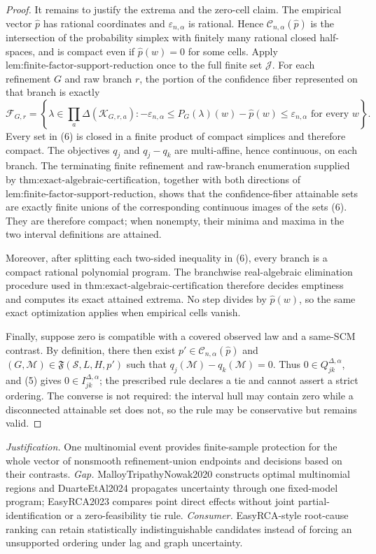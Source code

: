 \documentclass{article}
\begin{document}
\begin{proof}
It remains to justify the extrema and the zero-cell claim.  The empirical vector \(\widehat p\) has rational coordinates and \(\varepsilon_{n,\alpha}\) is rational.  Hence \(\mathcal C_{n,\alpha}(\widehat p)\) is the intersection of the probability simplex with finitely many rational closed half-spaces, and is compact even if \(\widehat p(w)=0\) for some cells.  Apply \(\text{lem:finite-factor-support-reduction}\) once to the full finite set \(\mathcal J\).  For each refinement \(G\) and raw branch \(r\), the portion of the confidence fiber represented on that branch is exactly
\[
\mathcal F_{G,r}
=\left\{\lambda\in\prod_a\Delta(\mathcal K_{G,r,a}):
-\varepsilon_{n,\alpha}
\le P_G(\lambda)(w)-\widehat p(w)
\le\varepsilon_{n,\alpha}
\text{ for every }w\right\}.
\tag{6}
\]
Every set in (6) is closed in a finite product of compact simplices and therefore compact.  The objectives \(q_j\) and \(q_j-q_k\) are multi-affine, hence continuous, on each branch.  The terminating finite refinement and raw-branch enumeration supplied by \(\text{thm:exact-algebraic-certification}\), together with both directions of \(\text{lem:finite-factor-support-reduction}\), shows that the confidence-fiber attainable sets are exactly finite unions of the corresponding continuous images of the sets (6).  They are therefore compact; when nonempty, their minima and maxima in the two interval definitions are attained.

Moreover, after splitting each two-sided inequality in (6), every branch is a compact rational polynomial program.  The branchwise real-algebraic elimination procedure used in \(\text{thm:exact-algebraic-certification}\) therefore decides emptiness and computes its exact attained extrema.  No step divides by \(\widehat p(w)\), so the same exact optimization applies when empirical cells vanish.

Finally, suppose zero is compatible with a covered observed law and a same-SCM contrast.  By definition, there then exist \(p'\in\mathcal C_{n,\alpha}(\widehat p)\) and \((G,\mathcal M)\in\mathfrak F(\mathcal S,L,H,p')\) such that \(q_j(\mathcal M)-q_k(\mathcal M)=0\).  Thus \(0\in Q_{jk}^{\Delta,\alpha}\), and (5) gives \(0\in I_{jk}^{\Delta,\alpha}\); the prescribed rule declares a tie and cannot assert a strict ordering.  The converse is not required: the interval hull may contain zero while a disconnected attainable set does not, so the rule may be conservative but remains valid.
\end{proof}
\par\smallskip\noindent \textit{Justification.} One multinomial event provides finite-sample protection for the whole vector of nonsmooth refinement-union endpoints and decisions based on their contrasts. \textit{Gap.} MalloyTripathyNowak2020 constructs optimal multinomial regions and DuarteEtAl2024 propagates uncertainty through one fixed-model program; EasyRCA2023 compares point direct effects without joint partial-identification or a zero-feasibility tie rule. \textit{Consumer.} EasyRCA-style root-cause ranking can retain statistically indistinguishable candidates instead of forcing an unsupported ordering under lag and graph uncertainty.
\end{document}
